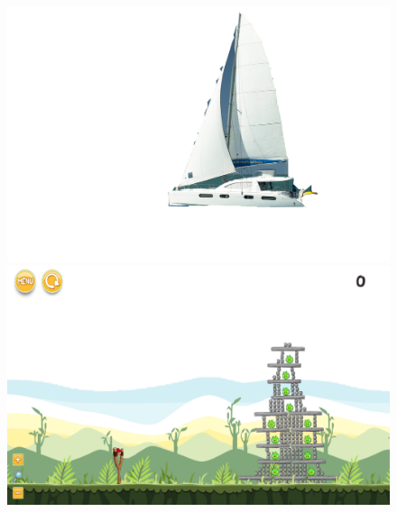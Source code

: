 \documentclass{dalthesis}
\begin{document}
\begin{figure}
  \includegraphics[width=\textwidth,height=\textheight,keepaspectratio]{levels/pictures/ships/catamaran.jpg}
  \includegraphics[width=\textwidth,height=\textheight,keepaspectratio]{levels/screenshots/ships/catamaran.png}
\end{figure}
\end{document}
